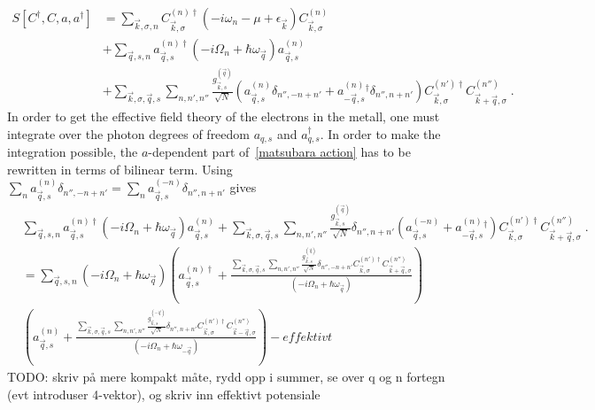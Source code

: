 \documentclass{article}
\begin{document}
\begin{align}
    S[C^{\dagger},C,a,a^{\dagger}] &= \sum_{\vec{k},\sigma, n} C^{(n)\dagger}_{\vec{k},\sigma}\left(-i\omega_n - \mu + \epsilon_{\vec{k}}\right) C^{(n)}_{\vec{k},\sigma} \nonumber \\
                                   &+ \sum_{\vec{q},s,n} a^{(n)\dagger}_{\vec{q},s} \left(-i\Omega_n + \hbar \omega_{\vec{q}}\right) a^{(n)}_{\vec{q},s} \label{matsubara action} \\
                                   &+ \sum_{\vec{k},\sigma,\vec{q},s} \sum_{n,n',n''} \frac{g_{\vec{k},s}^{(\vec{q})}}{\sqrt{N}} \left(a^{(n)}_{\vec{q},s} \delta_{n'', -n + n'} + a^{(n)}_{-\vec{q}, s}^{\dagger}  \delta_{n'',n + n'}\right) C^{(n')\dagger}_{\vec{k},\sigma}C^{(n'')}_{\vec{k} + \vec{q},\sigma}\;.\nonumber
\end{align}
In order to get the effective field theory of the electrons in the metall, one must integrate over the photon degrees of freedom $a_{q,s}$ and $a_{q,s}^{\dagger}$. In order to make the integration possible, the $a$-dependent part of~\cref{matsubara action} has to be rewritten in terms of bilinear term. Using $\sum_n a^{(n)}_{\vec{q},s} \delta_{n'', -n + n'} = \sum_n a^{(-n)}_{\vec{q},s} \delta_{n'', n + n'}$ gives
\begin{align}
     &\sum_{\vec{q},s,n} a^{(n)\dagger}_{\vec{q},s} \left(-i\Omega_n + \hbar \omega_{\vec{q}}\right) a^{(n)}_{\vec{q},s} + \sum_{\vec{k},\sigma,\vec{q},s} \sum_{n,n',n''} \frac{g_{\vec{k},s}^{(\vec{q})}}{\sqrt{N}} \delta_{n'',n + n'} \left(a^{(-n)}_{\vec{q},s} + a^{(n)}_{-\vec{q}, s}^{\dagger}\right) C^{(n')\dagger}_{\vec{k},\sigma}C^{(n'')}_{\vec{k} + \vec{q},\sigma}\;.\nonumber \\
     &= \sum_{\vec{q},s,n} \left(-i\Omega_n + \hbar \omega_{\vec{q}}\right)  \left(a^{(n)\dagger}_{\vec{q},s} + \frac{\sum_{\vec{k},\sigma,\vec{q},s} \sum_{n,n',n''} \frac{g_{\vec{k},s}^{(\vec{q})}}{\sqrt{N}} \delta_{n'',-n + n'}C^{(n')\dagger}_{\vec{k},\sigma}C^{(n'')}_{\vec{k} + \vec{q},\sigma} }{\left(-i\Omega_n + \hbar \omega_{\vec{q}}\right)} \right) \nonumber\\
     & \left(a^{(n)}_{\vec{q},s} + \frac{\sum_{\vec{k},\sigma,\vec{q},s} \sum_{n,n',n''} \frac{g_{\vec{k},s}^{(-\vec{q})}}{\sqrt{N}} \delta_{n'',n + n'}C^{(n')\dagger}_{\vec{k},\sigma}C^{(n'')}_{\vec{k} - \vec{q},\sigma} }{\left(-i\Omega_n + \hbar \omega_{-\vec{q}}\right)}\right) - effektivt \nonumber
\end{align}
TODO: skriv på mere kompakt måte, rydd opp i summer, se over q og n fortegn (evt introduser 4-vektor), og skriv inn effektivt potensiale

\printbibliography
\end{document}
